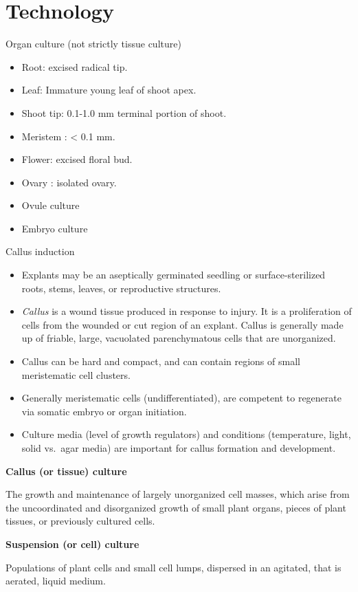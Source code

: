 \documentclass[
  ignorenonframetext,
  aspectratio=169]{beamer}
\providecommand{\tightlist}{%
  \setlength{\itemsep}{0pt}\setlength{\parskip}{0pt}}
\begin{document}
\hypertarget{technology}{%
\section{Technology}\label{technology}}

\begin{frame}{Organ culture (not strictly tissue culture)}
\protect\hypertarget{organ-culture-not-strictly-tissue-culture}{}
\begin{itemize}
\tightlist
\item
  Root: excised radical tip.
\item
  Leaf: Immature young leaf of shoot apex.
\item
  Shoot tip: 0.1-1.0 mm terminal portion of shoot.
\item
  Meristem : \textless{} 0.1 mm.
\item
  Flower: excised floral bud.
\item
  Ovary : isolated ovary.
\item
  Ovule culture
\item
  Embryo culture
\end{itemize}
\end{frame}

\begin{frame}{Callus induction}
\protect\hypertarget{callus-induction}{}
\begin{itemize}
\tightlist
\item
  Explants may be an aseptically germinated seedling or
  surface-sterilized roots, stems, leaves, or reproductive structures.
\item
  \emph{Callus} is a wound tissue produced in response to injury. It is
  a proliferation of cells from the wounded or cut region of an explant.
  Callus is generally made up of friable, large, vacuolated
  parenchymatous cells that are unorganized.
\item
  Callus can be hard and compact, and can contain regions of small
  meristematic cell clusters.
\item
  Generally meristematic cells (undifferentiated), are competent to
  regenerate via somatic embryo or organ initiation.
\item
  Culture media (level of growth regulators) and conditions
  (temperature, light, solid vs.~agar media) are important for callus
  formation and development.
\end{itemize}
\end{frame}

\begin{frame}{}
\protect\hypertarget{section-11}{}
\small

\textbf{Callus (or tissue) culture}

The growth and maintenance of largely unorganized cell masses, which
arise from the uncoordinated and disorganized growth of small plant
organs, pieces of plant tissues, or previously cultured cells.

\textbf{Suspension (or cell) culture}

Populations of plant cells and small cell lumps, dispersed in an
agitated, that is aerated, liquid medium.
\end{frame}
\end{document}
